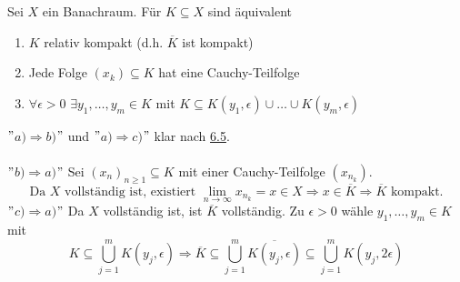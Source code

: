 \begin{kor}
	Sei $X$ ein Banachraum. Für $K \subseteq X$ sind äquivalent
	\begin{enumerate}[label=\alph*\upshape)]
		\item $K$ relativ kompakt (d.h. $\overline{K}$ ist kompakt)
		\item Jede Folge $(x_{k}) \subseteq K$ hat eine Cauchy-Teilfolge
		\item $\forall \epsilon > 0$ $\exists y_{1}, \dotsc, y_{m} \in K$ mit $K \subseteq K(y_{1}, \epsilon) \cup \dotsc \cup K(y_{m}, \epsilon)$
	\end{enumerate}
\end{kor}

\begin{beweis}
	$"$$a) \Rightarrow b)$$"$ und $"$$a) \Rightarrow c)$$"$ klar nach \hyperref[satz:6.5]{6.5}. \\ \\
	$"$$b) \Rightarrow a)$$"$ Sei $(x_{n})_{n \geq 1} \subseteq K$ mit einer Cauchy-Teilfolge $(x_{n_{k}})$. \\
		\[ \text{Da } X \text{ vollständig ist, existiert } \lim_{n \rightarrow \infty} x_{n_{k}} = x \in X \Rightarrow x \in \overline{K} \Rightarrow \overline{K} \text{ kompakt.} \]
	$"$$c) \Rightarrow a)$$"$ Da $X$ vollständig ist, ist $\overline{K}$ vollständig. Zu $\epsilon > 0$ wähle $y_{1}, \dotsc, y_{m} \in K$ mit 
		\[ K \subseteq \bigcup_{j = 1}^{m} K(y_{j}, \epsilon) \Rightarrow \overline{K} \subseteq \bigcup_{j = 1}^{m} \overline{K(y_{j}, \epsilon)} \subseteq \bigcup_{j = 1}^{m} K(y_{j}, 2\epsilon) \]
\end{beweis}



\newpage